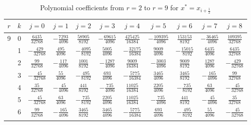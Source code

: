 \begin{table}
  \begin{center}
    \caption{Polynomial coefficients from $r=2$ to $r=9$ for $x^*=x_{i+\frac{1}{2}}$}
    \label{tab:polynomial_coefficients}
    \begin{tabular}{ccccccccccc}
      \toprule
      $r$  &  $k$  &  $j=0$  &  $j=1$  &  $j=2$  &  $j=3$  &  $j=4$  &  $j=5$  &  $j=6$  &  $j=7$  &  $j=8$  \\
      \midrule
      9  &  0  &  $ \frac{6435}{32768}$  &    $-\frac{7293}{4096}$  &  $ \frac{58905}{8192}$  &  $-\frac{ 69615}{4096}$  & $ \frac{425425}{16384}$  &  $-\frac{109395}{ 4096}$  &  $ \frac{153153}{8192}$  & $-\frac{ 36465}{ 4096}$  &  $ \frac{109395}{32768}$ \\ \addlinespace
         &  1  &  $-\frac{ 429}{32768}$  &    $ \frac{ 495}{4096}$  &  $-\frac{ 4095}{8192}$  &  $ \frac{  5005}{4096}$  & $-\frac{ 32175}{16384}$  &  $ \frac{  9009}{ 4096}$  &  $-\frac{ 15015}{8192}$  & $ \frac{  6435}{ 4096}$  &  $ \frac{  6435}{32768}$ \\ \addlinespace
         &  2  &  $ \frac{  99}{32768}$  &    $-\frac{ 117}{4096}$  &  $ \frac{ 1001}{8192}$  &  $-\frac{  1287}{4096}$  & $ \frac{  9009}{16384}$  &  $-\frac{  3003}{ 4096}$  &  $ \frac{  9009}{8192}$  & $ \frac{  1287}{ 4096}$  &  $-\frac{   429}{32768}$ \\ \addlinespace
         &  3  &  $-\frac{  45}{32768}$  &    $ \frac{  55}{4096}$  &  $-\frac{  495}{8192}$  &  $ \frac{   693}{4096}$  & $-\frac{  5775}{16384}$  &  $ \frac{  3465}{ 4096}$  &  $ \frac{  3465}{8192}$  & $-\frac{   165}{ 4096}$  &  $ \frac{    99}{32768}$ \\ \addlinespace
         &  4  &  $ \frac{  35}{32768}$  &    $-\frac{  45}{4096}$  &  $ \frac{  441}{8192}$  &  $-\frac{   735}{4096}$  & $ \frac{ 11025}{16384}$  &  $ \frac{  2205}{ 4096}$  &  $-\frac{   735}{8192}$  & $ \frac{    63}{ 4096}$  &  $-\frac{    45}{32768}$ \\ \addlinespace
         &  5  &  $-\frac{  45}{32768}$  &    $ \frac{  63}{4096}$  &  $-\frac{  735}{8192}$  &  $ \frac{  2205}{4096}$  & $ \frac{ 11025}{16384}$  &  $-\frac{   735}{ 4096}$  &  $ \frac{   441}{8192}$  & $-\frac{    45}{ 4096}$  &  $ \frac{    35}{32768}$ \\ \addlinespace
         &  6  &  $ \frac{  99}{32768}$  &    $-\frac{ 165}{4096}$  &  $ \frac{ 3465}{8192}$  &  $ \frac{  3465}{4096}$  & $-\frac{  5775}{16384}$  &  $ \frac{   693}{ 4096}$  &  $-\frac{   495}{8192}$  & $ \frac{    55}{ 4096}$  &  $-\frac{    45}{32768}$ \\ \addlinespace

\end{tabular}
\end{center}
\end{table}
